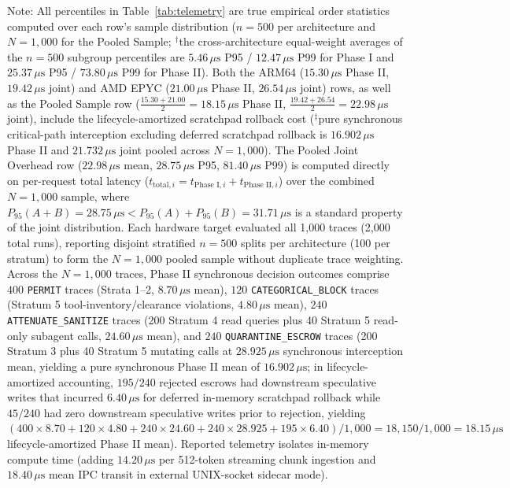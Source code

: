 \documentclass[conference,10pt]{IEEEtran}
\begin{document}
\begin{table}[t]
{\raggedright \footnotesize Note: All percentiles in Table~\ref{tab:telemetry} are true empirical order statistics computed over each row's sample distribution ($n=500$ per architecture and $N=1{,}000$ for the Pooled Sample; $^\dagger$the cross-architecture equal-weight averages of the $n=500$ subgroup percentiles are $5.46\,\mu\text{s}$ P95 / $12.47\,\mu\text{s}$ P99 for Phase I and $25.37\,\mu\text{s}$ P95 / $73.80\,\mu\text{s}$ P99 for Phase II). Both the ARM64 ($15.30\,\mu\text{s}$ Phase II, $19.42\,\mu\text{s}$ joint) and AMD EPYC ($21.00\,\mu\text{s}$ Phase II, $26.54\,\mu\text{s}$ joint) rows, as well as the Pooled Sample row ($\frac{15.30 + 21.00}{2} = 18.15\,\mu\text{s}$ Phase II, $\frac{19.42 + 26.54}{2} = 22.98\,\mu\text{s}$ joint), include the lifecycle-amortized scratchpad rollback cost ($^\ddagger$pure synchronous critical-path interception excluding deferred scratchpad rollback is $16.902\,\mu\text{s}$ Phase II and $21.732\,\mu\text{s}$ joint pooled across $N=1{,}000$). The Pooled Joint Overhead row ($22.98\,\mu\text{s}$ mean, $28.75\,\mu\text{s}$ P95, $81.40\,\mu\text{s}$ P99) is computed directly on per-request total latency ($t_{\text{total}, i} = t_{\text{Phase I}, i} + t_{\text{Phase II}, i}$) over the combined $N=1{,}000$ sample, where $P_{95}(A+B) = 28.75\,\mu\text{s} < P_{95}(A) + P_{95}(B) = 31.71\,\mu\text{s}$ is a standard property of the joint distribution. Each hardware target evaluated all 1,000 traces (2,000 total runs), reporting disjoint stratified $n=500$ splits per architecture (100 per stratum) to form the $N=1{,}000$ pooled sample without duplicate trace weighting. Across the $N=1{,}000$ traces, Phase II synchronous decision outcomes comprise $400$ \texttt{PERMIT} traces (Strata 1--2, $8.70\,\mu\text{s}$ mean), $120$ \texttt{CATEGORICAL\_BLOCK} traces (Stratum 5 tool-inventory/clearance violations, $4.80\,\mu\text{s}$ mean), $240$ \texttt{ATTENUATE\_SANITIZE} traces (200 Stratum 4 read queries plus 40 Stratum 5 read-only subagent calls, $24.60\,\mu\text{s}$ mean), and $240$ \texttt{QUARANTINE\_ESCROW} traces (200 Stratum 3 plus 40 Stratum 5 mutating calls at $28.925\,\mu\text{s}$ synchronous interception mean, yielding a pure synchronous Phase II mean of $16.902\,\mu\text{s}$; in lifecycle-amortized accounting, $195/240$ rejected escrows had downstream speculative writes that incurred $6.40\,\mu\text{s}$ for deferred in-memory scratchpad rollback while $45/240$ had zero downstream speculative writes prior to rejection, yielding $(400 \times 8.70 + 120 \times 4.80 + 240 \times 24.60 + 240 \times 28.925 + 195 \times 6.40) / 1{,}000 = 18{,}150 / 1{,}000 = 18.15\,\mu\text{s}$ lifecycle-amortized Phase II mean). Reported telemetry isolates in-memory compute time (adding $14.20\,\mu\text{s}$ per 512-token streaming chunk ingestion and $18.40\,\mu\text{s}$ mean IPC transit in external UNIX-socket sidecar mode).\par}
\end{table}
\end{document}
